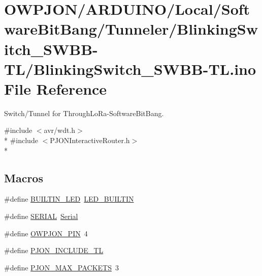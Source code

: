 \hypertarget{BlinkingSwitch__SWBB-TL_8ino}{\section{O\-W\-P\-J\-O\-N/\-A\-R\-D\-U\-I\-N\-O/\-Local/\-Software\-Bit\-Bang/\-Tunneler/\-Blinking\-Switch\-\_\-\-S\-W\-B\-B-\/\-T\-L/\-Blinking\-Switch\-\_\-\-S\-W\-B\-B-\/\-T\-L.ino File Reference}
\label{BlinkingSwitch__SWBB-TL_8ino}
}


Switch/\-Tunnel for Through\-Lo\-Ra-\/\-Software\-Bit\-Bang.  


{\ttfamily \#include $<$avr/wdt.\-h$>$}\\*
{\ttfamily \#include $<$P\-J\-O\-N\-Interactive\-Router.\-h$>$}\\*
\subsection*{Macros}
\begin{DoxyCompactItemize}
\item 
\#define \hyperlink{BlinkingSwitch__SWBB-TL_8ino_a4a71aecac635579082c10addb16df4a0}{B\-U\-I\-L\-T\-I\-N\-\_\-\-L\-E\-D}~\hyperlink{Helvetiny__Blink__CDC_8ino_a450a7c16ead7b3c7b882536b08f30a00}{L\-E\-D\-\_\-\-B\-U\-I\-L\-T\-I\-N}
\item 
\#define \hyperlink{BlinkingSwitch__SWBB-TL_8ino_aae3f0b4211ba45d265973d40ccbb5fd1}{S\-E\-R\-I\-A\-L}~\hyperlink{HardwareSerial_8h_a7b8c4a195c58f9eb8750e94955c5aa4b}{Serial}
\item 
\#define \hyperlink{BlinkingSwitch__SWBB-TL_8ino_a34fea28a7531677453da5e072f172a78}{O\-W\-P\-J\-O\-N\-\_\-\-P\-I\-N}~4
\item 
\#define \hyperlink{BlinkingSwitch__SWBB-TL_8ino_aeebf956fc71944a6237c3af6a038ff70}{P\-J\-O\-N\-\_\-\-I\-N\-C\-L\-U\-D\-E\-\_\-\-T\-L}
\item 
\#define \hyperlink{BlinkingSwitch__SWBB-TL_8ino_af093da5eac99580be6ba61b4dc79f2c1}{P\-J\-O\-N\-\_\-\-M\-A\-X\-\_\-\-P\-A\-C\-K\-E\-T\-S}~3
\end{DoxyCompactItemize}
